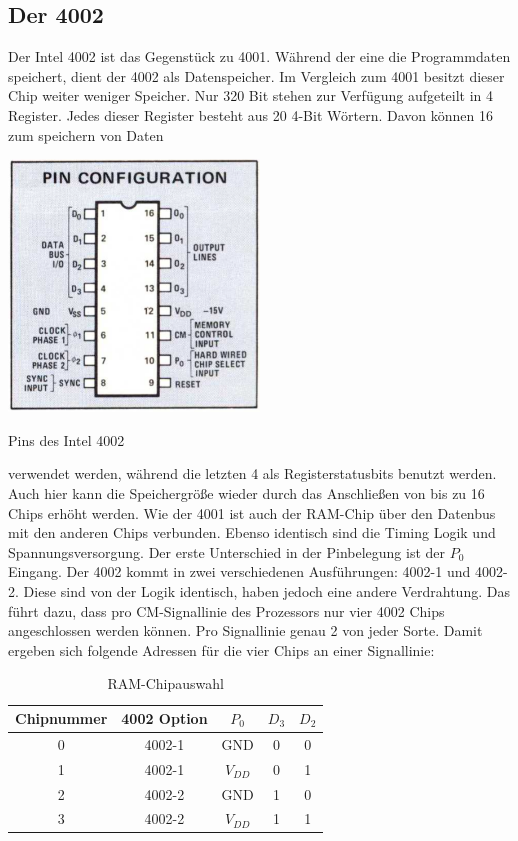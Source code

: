 \subsection{Der 4002}
Der Intel 4002 ist das Gegenstück zu 4001. Während der eine die Programmdaten speichert, dient der 4002 als Datenspeicher. Im Vergleich zum 4001 besitzt dieser Chip weiter weniger Speicher. Nur 320 Bit stehen zur Verfügung aufgeteilt in 4 Register. Jedes dieser Register besteht aus 20 4-Bit Wörtern. Davon können 16 zum speichern von Daten
\vspace{-23pt}
 \begin{floatingfigure}[r]{.5\textwidth}
 	\vspace{-10pt}
 	\includegraphics[width=0.5\textwidth]{figures/pins_4002.png}
 	\caption{Pins des Intel 4002}
 	\label{fig:pins_4002}
 \end{floatingfigure}
verwendet werden, während die letzten 4 als Registerstatusbits benutzt werden. Auch hier kann die Speichergröße wieder durch das Anschließen von bis zu 16 Chips erhöht werden. Wie der 4001 ist auch der RAM-Chip über den Datenbus mit den anderen Chips verbunden. Ebenso identisch sind die Timing Logik und Spannungsversorgung. Der erste Unterschied in der Pinbelegung ist der $P_0$ Eingang. Der 4002 kommt in zwei verschiedenen Ausführungen: 4002-1 und 4002-2. Diese sind von der Logik identisch, haben jedoch eine andere Verdrahtung. Das führt dazu, dass pro CM-Signallinie des Prozessors nur vier 4002 Chips angeschlossen werden können. Pro Signallinie genau 2 von jeder Sorte.
Damit ergeben sich folgende Adressen für die vier Chips an einer Signallinie:
\begin{table}[H]
	\centering
	\begin{tabular}{c | c | c | c  c}
		Chipnummer & 4002 Option & $P_0$ & $D_3$ & $D_2$ \\
		\hline
		0 	& 4002-1 & GND & 0 & 0 \\
		1	& 4002-1 & $V_{DD}$ & 0 & 1 \\
		2	& 4002-2 & GND & 1 & 0 \\
		3	& 4002-2 & $V_{DD}$ & 1 & 1	
	\end{tabular}
	\caption{RAM-Chipauswahl}
	\label{ramauswahl}
\end{table}

